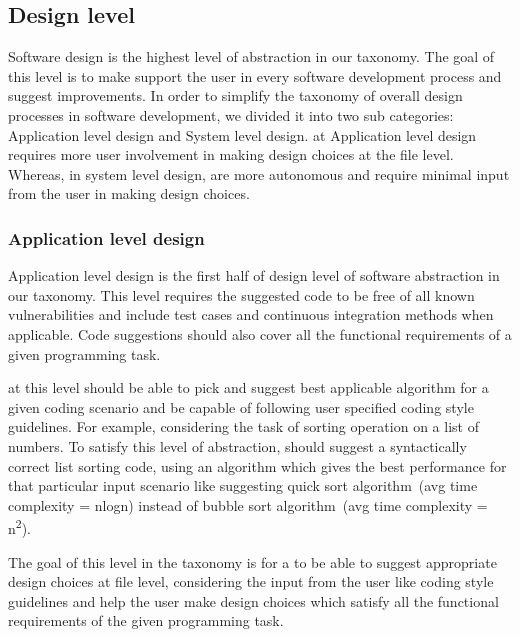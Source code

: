 \subsection{Design level}
Software design is the highest level of abstraction in our taxonomy. The goal of this level is to make \cct{} support the user in every software development process and suggest improvements.
In order to simplify the taxonomy of overall design processes in software development, we divided it into two sub categories: Application level design and System level design. 
\cct{} at Application level design requires more user involvement in making design choices at the file level. Whereas, in system level design, \cct{} are more autonomous and require minimal input from the user in making design choices.

\subsubsection{Application level design}
\label{low_design}
Application level design is the first half of design level of software abstraction in our taxonomy.
This level requires the suggested code to be free of all known vulnerabilities and include test cases and continuous integration methods when applicable.
Code suggestions should also cover all the functional requirements of a given programming task.

\cct{} at this level should be able to pick and suggest best applicable algorithm for a given coding scenario and be capable of following user specified coding style guidelines.
For example, considering the task of sorting operation on a list of numbers. To satisfy this level of abstraction, \cct{} should suggest a syntactically correct list sorting code, using an algorithm which gives the best performance for that particular input scenario like suggesting quick sort algorithm~(avg time complexity = nlogn) instead of bubble sort algorithm~(avg time complexity = n\textsuperscript{2}).

The goal of this level in the taxonomy is for a \cct{} to be able to suggest appropriate design choices at file level, considering the input from the user like coding style guidelines and help the user make design choices which satisfy all the functional requirements of the given programming task.

